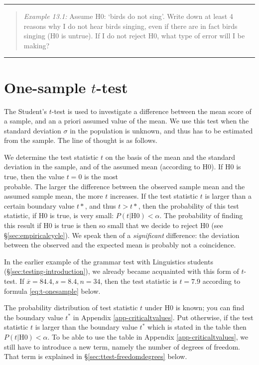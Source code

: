 \documentclass[
]{book}
\begin{document}
\begin{center}\rule{0.5\linewidth}{0.5pt}\end{center}

\begin{quote}
\emph{Example 13.1:}
Assume H0: `birds do not sing'. Write
down at least 4 reasons why I do not hear birds singing, even
if there are in fact birds singing (H0 is untrue). If I do not reject H0,
what type of error will I be making?
\end{quote}

\begin{center}\rule{0.5\linewidth}{0.5pt}\end{center}

\section{\texorpdfstring{One-sample \(t\)-test}{One-sample t-test}}\label{sec:ttest-onesample}

The Student's \(t\)-test is used to investigate a difference
between the mean score of a sample, and an a priori assumed value
of the mean. We use this test when the standard deviation
\(\sigma\) in the population is unknown, and thus has to be estimated from
the sample. The line of thought is as follows.

We determine the test statistic \(t\) on the basis of the mean and the
standard deviation in the sample, and of the assumed mean (according to H0).
If H0 is true, then the value \(t=0\) is the most\\
probable. The larger the difference between the observed sample mean and the
assumed sample mean, the more \(t\) increases. If the test statistic \(t\) is larger than
a certain boundary value \(t*\), and thus \(t>t*\), then the probability of this test statistic,
if H0 is true, is very small: \(P(t|\textrm{H0}) < \alpha\). The probability of finding this result
if H0 is true is then so small that we decide to reject H0
(see §\ref{sec:empiricalcycle}). We speak then of a \emph{significant} difference:
the deviation between the observed and the expected mean is probably not a
coincidence.

In the earlier example of the grammar test with Linguistics students
(§\ref{sec:testing-introduction}), we already became acquainted with
this form of \(t\)-test.
If \(\overline{x}=84.4, s=8.4, n=34\), then the test statistic
is \(t=7.9\) according to formula \eqref{eq:t-onesample} below.

The probability distribution of test statistic \(t\) under H0 is known;
you can find the boundary value \(t^*\) in
Appendix \ref{app-criticaltvalues}. Put otherwise, if the test statistic \(t\)
is larger than the boundary value \(t^*\) which is stated in the table then
\(P(t|\textrm{H0})<\alpha\). To be able to use the table in Appendix
\ref{app-criticaltvalues}, we still have to introduce a new term,
namely the number of degrees of freedom. That term is
explained in
§\ref{sec:ttest-freedomdegrees} below.
\end{document}

